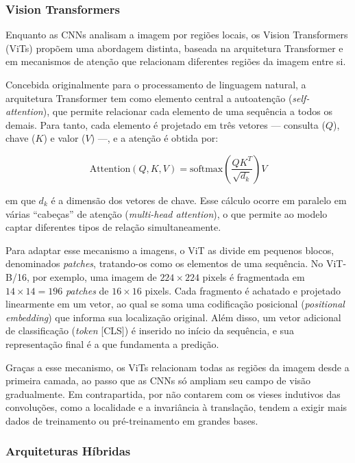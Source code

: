 \subsubsection{Vision Transformers}
\hspace{+15pt}

Enquanto as CNNs analisam a imagem por regiões locais, os Vision Transformers (ViTs) propõem uma abordagem distinta, baseada na arquitetura Transformer e em mecanismos de atenção que relacionam diferentes regiões da imagem entre si.

Concebida originalmente para o processamento de linguagem natural, a arquitetura Transformer tem como elemento central a autoatenção (\textit{self-attention}), que permite relacionar cada elemento de uma sequência a todos os demais. %
Para tanto, cada elemento é projetado em três vetores — consulta ($Q$), chave ($K$) e valor ($V$) —, e a atenção é obtida por:

\begin{equation}
\text{Attention}(Q, K, V) = \text{softmax}\left(\frac{QK^{T}}{\sqrt{d_k}}\right)V
\end{equation}

\noindent em que $d_k$ é a dimensão dos vetores de chave. Esse cálculo ocorre em paralelo em várias ``cabeças'' de atenção (\textit{multi-head attention}), o que permite ao modelo captar diferentes tipos de relação simultaneamente.

Para adaptar esse mecanismo a imagens, o ViT as divide em pequenos blocos, denominados \textit{patches}, tratando-os como os elementos de uma sequência. No ViT-B/16, por exemplo, uma imagem de $224 \times 224$ pixels é fragmentada em $14 \times 14 = 196$ \textit{patches} de $16 \times 16$ pixels. Cada fragmento é achatado e projetado linearmente em um vetor, ao qual se soma uma codificação posicional (\textit{positional embedding}) que informa sua localização original. Além disso, um vetor adicional de classificação (\textit{token} [CLS]) é inserido no início da sequência, e sua representação final é a que fundamenta a predição. %

Graças a esse mecanismo, os ViTs relacionam todas as regiões da imagem desde a primeira camada, ao passo que as CNNs só ampliam seu campo de visão gradualmente. Em contrapartida, por não contarem com os vieses indutivos das convoluções, como a localidade e a invariância à translação, tendem a exigir mais dados de treinamento ou pré-treinamento em grandes bases.

\subsubsection{Arquiteturas Híbridas}
\hspace{+15pt}

